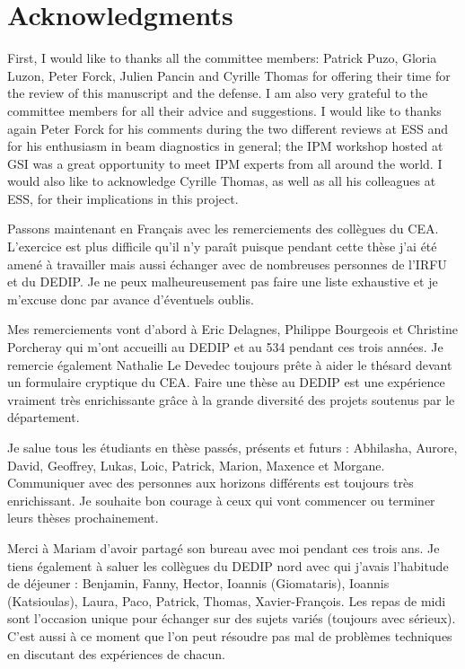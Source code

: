 \chapter*{Acknowledgments}
\adjustmtc
First, I would like to thanks all the committee members: Patrick Puzo, Gloria Luzon, Peter Forck, Julien Pancin and Cyrille Thomas for offering their time for the review of this manuscript and the defense. I am also very grateful to the committee members for all their advice and suggestions. I would like to thanks again Peter Forck for his comments during the two different reviews at ESS and for his enthusiasm in beam diagnostics in general; the IPM workshop hosted at GSI was a great opportunity to meet IPM experts from all around the world. I would also like to acknowledge Cyrille Thomas, as well as all his colleagues at ESS, for their implications in this project.

Passons maintenant en Français avec les remerciements des collègues du CEA. L’exercice est plus difficile qu’il n’y paraît puisque pendant cette thèse j’ai été amené à travailler mais aussi échanger avec de nombreuses personnes de l’IRFU et du DEDIP. Je ne peux malheureusement pas faire une liste exhaustive et je m’excuse donc par avance d'éventuels oublis.

Mes remerciements vont d’abord à Eric Delagnes, Philippe Bourgeois et Christine Porcheray qui m’ont accueilli au DEDIP et au 534 pendant ces trois années. Je remercie également Nathalie Le Devedec toujours prête à aider le thésard devant un formulaire cryptique du CEA. Faire une thèse au DEDIP est une expérience vraiment très enrichissante grâce à la grande diversité des projets soutenus par le département.

Je salue tous les étudiants en thèse passés, présents et futurs : Abhilasha, Aurore, David, Geoffrey, Lukas, Loic, Patrick, Marion, Maxence et Morgane. Communiquer avec des personnes aux horizons différents est toujours très enrichissant. Je souhaite bon courage à ceux qui vont commencer ou terminer leurs thèses prochainement.

Merci à Mariam d’avoir partagé son bureau avec moi pendant ces trois ans. Je tiens également à saluer les collègues du DEDIP nord avec qui j’avais l’habitude de déjeuner : Benjamin, Fanny, Hector, Ioannis (Giomataris), Ioannis (Katsioulas), Laura, Paco, Patrick, Thomas, Xavier-François. Les repas de midi sont l’occasion unique pour échanger sur des sujets variés (toujours avec sérieux). C’est aussi à ce moment que l’on peut résoudre pas mal de problèmes techniques en discutant des expériences de chacun.

